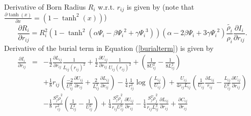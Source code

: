 \documentclass[12pt]{article}
\begin{document}
Derivative of Born Radius $R_{i}$ w.r.t. $r_{ij}$ is given by
(note that $\frac{\partial \tanh(x)}{\partial x} = (1-\tanh^{2}(x))$)
\begin{equation}
\label{bornradiiderivative}
\frac{\partial R_{i}}{\partial r_{ij}} = R_{i}^{2}\left(1 - {\tanh}^{2}\left({{\alpha}{\Psi_{i}} - {\beta}{\Psi_{i}}^{2} + {\gamma}
     {\Psi_{i}}^{3}}\right)\right)\left({\alpha} - 2{\beta}{\Psi_{i}} + 3{\gamma}{\Psi_{i}}^{2}\right)
     \frac{\tilde{\rho_{i}}}{\rho_{i}}\frac{\partial {I_{i}}}{\partial r_{ij}}
     .
\end{equation}
Derivative of the burial term in Equation (\ref{burialterm}) is given by
\begin{eqnarray}
\frac{\partial I_{i}}{\partial r_{ij}} & = & -\frac{1}{2}\frac{\partial L_{ij}}{\partial r_{ij}}\frac{1}{L_{ij}(r_{ij})^2} + 
  \frac{1}{2}\frac{\partial U_{ij}}{\partial r_{ij}}\frac{1}{U_{ij}(r_{ij})^2} + \left(\frac{1}{8 U_{ij}^2}-\frac{1}{8 L_{ij}^2}\right) \\ \nonumber
  & & + \frac{1}{8}r_{ij}
  \left(\frac{-2}{U_{ij}^{3}}\frac{\partial U_{ij}}{\partial r_{ij}}
  + \frac{2}{L_{ij}^{3}}\frac{\partial L_{ij}}{\partial r_{ij}}\right)
  -\frac{1}{4}\frac{1}{r_{ij}^{2}}\log\left({\frac{L_{ij}}{U_{ij}}}\right) +
  \frac{U_{ij}}{4r_{ij}L_{ij}}\left(\frac{1}{U_{ij}}\frac{\partial L_{ij}}{r_{ij}} - \frac{L_{ij}}{U_{ij}^2}\frac{\partial U_{ij}}{\partial r_{ij} } \right) \\ \nonumber
  & & -\frac{1}{8}
  \frac{S_{j}^{2} {\tilde\rho}_{j}^{2}}{r_{ij}^{2}}\left(\frac{1}{L_{ij}^{2}} - \frac{1}{U_{ij}^{2}} \right) +
  \frac{1}{4}\frac{S_{j}^{2}{\tilde\rho}_{j}^{2}}{r_{ij}U_{ij}^{3}}\frac{\partial U_{ij}}{\partial r_{ij}} 
  - \frac{1}{4}\frac{S_{j}^{2}{\tilde\rho}_{j}^{2}}{r_{ij}L_{ij}^{3}}\frac{\partial L_{ij}}{\partial r_{ij}}
  + \frac{\partial C_{ij}}{\partial r_{ij}}
\end{eqnarray}  
\end{document}
